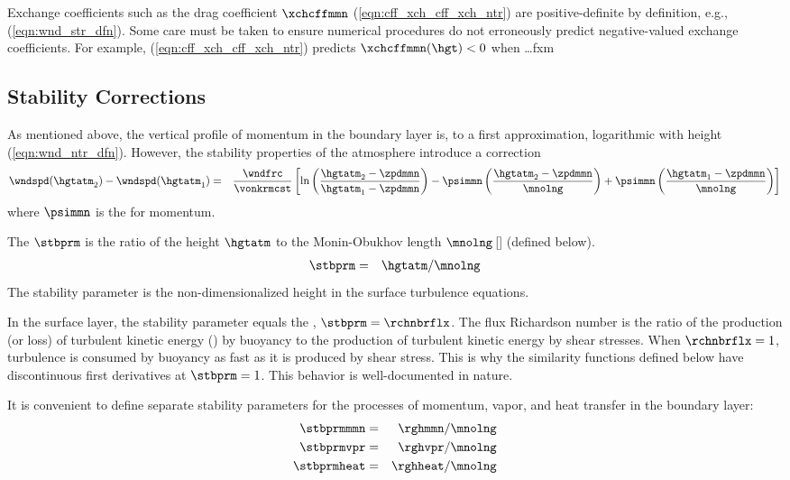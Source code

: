 \documentclass[12pt,twoside]{book}
\begin{document}
Exchange coefficients such as the drag coefficient $\xchcffmmn$
(\ref{eqn:cff_xch_cff_xch_ntr}) are positive-definite by definition,
e.g., (\ref{eqn:wnd_str_dfn}). 
Some care must be taken to ensure numerical procedures do not
erroneously predict negative-valued exchange coefficients.
For example, (\ref{eqn:cff_xch_cff_xch_ntr}) predicts
$\xchcffmmn(\hgt) < 0$ when \ldots fxm %

\subsection[Stability Corrections]{Stability Corrections}
As mentioned above, the vertical profile of momentum in the boundary
layer is, to a first approximation, logarithmic with height
(\ref{eqn:wnd_ntr_dfn}). 
However, the stability properties of the atmosphere introduce a
correction 
\begin{eqnarray}
\wndspd ( \hgtatm_{2} ) - \wndspd ( \hgtatm_{1} ) & = & 
\frac{\wndfrc}{\vonkrmcst} \left[
\ln \left( \frac{\hgtatm_{2} - \zpdmmn}{\hgtatm_{1} - \zpdmmn} \right) 
- \psimmn \left( \frac{\hgtatm_{2} - \zpdmmn}{\mnolng} \right)
+ \psimmn \left( \frac{\hgtatm_{1} - \zpdmmn}{\mnolng} \right)
\right]
\end{eqnarray}
where $\psimmn$ is the  for
momentum. 

The  $\stbprm$ is the ratio of the height
$\hgtatm$ to the Monin-Obukhov length $\mnolng$\,[\m] (defined below).
\begin{eqnarray}
\stbprm & = & \hgtatm / \mnolng
\label{eqn:stb_prm_dfn}
\end{eqnarray}
The stability parameter is the non-dimensionalized height in the
surface turbulence equations.  

In the surface layer, the stability parameter equals the 
, $\stbprm = \rchnbrflx$.
The flux Richardson number is the ratio of the production (or loss) of
turbulent kinetic energy () by buoyancy to the production
of turbulent kinetic energy by shear stresses.
When $\rchnbrflx = 1$, turbulence is consumed by buoyancy as fast as
it is produced by shear stress.
This is why the similarity functions defined below have discontinuous
first derivatives at $\stbprm = 1$.
This behavior is well-documented in nature.

It is convenient to define separate stability parameters for the
processes of momentum, vapor, and heat transfer in the boundary
layer: 
\begin{eqnarray}
\label{eqn:stb_prm_mmn_dfn}
\stbprmmmn & = & \rghmmn / \mnolng \nonumber \\
\stbprmvpr & = & \rghvpr / \mnolng \\
\stbprmheat & = & \rghheat / \mnolng \nonumber
\end{eqnarray}
\end{document}
